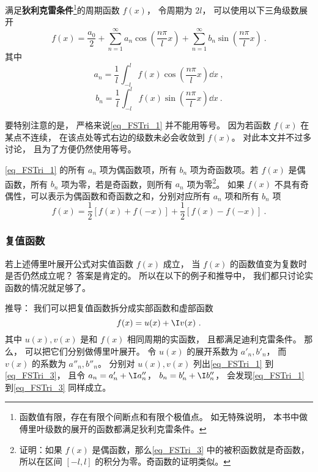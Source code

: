 


满足\textbf{狄利克雷条件}\footnote{函数值有限，存在有限个间断点和有限个极值点。 如无特殊说明， 本书中做傅里叶级数的展开的函数都满足狄利克雷条件。}的周期函数 $f(x)$， 令周期为 $2l$， 可以使用以下三角级数展开
\begin{equation}\label{eq_FSTri_1}
f( x ) = \frac{a_0}{2} + \sum_{n = 1}^\infty a_n \cos (\frac{n\pi}{l}x) + \sum_{n = 1}^\infty b_n \sin (\frac{n\pi}{l}x)~.
\end{equation}
其中
\begin{equation}\label{eq_FSTri_2}
a_n = \frac{1}{l} \int_{ - l}^l f( x )\cos(\frac{n\pi}{l}x) \dd{x} ~,
\end{equation}
\begin{equation}\label{eq_FSTri_3}
b_n = \frac{1}{l} \int_{ - l}^l f( x )\sin(\frac{n\pi}{l}x) \dd{x}~.
\end{equation}

要特别注意的是， 严格来说\autoref{eq_FSTri_1} 并不能用等号。 因为若函数 $f(x)$ 在某点不连续， 在该点处等式右边的级数未必会收敛到 $f(x)$。 对此本文并不过多讨论， 且为了方便仍然使用等号。

\autoref{eq_FSTri_1} 的所有 $a_n$ 项为偶函数项，所有 $b_n$ 项为奇函数项。若 $f(x)$ 是偶函数，所有 $b_n$ 项为零，若是奇函数，则所有 $a_n$ 项为零\footnote{证明：如果 $f(x)$ 是偶函数，那么\autoref{eq_FSTri_3} 中的被积函数就是奇函数， 所以在区间 $[-l,l]$ 的积分为零。奇函数的证明类似。}。 如果 $f(x)$ 不具有奇偶性，可以表示为偶函数和奇函数之和，分别对应所有 $a_n$ 项和所有 $b_n$ 项
\begin{equation}
f(x) = \frac12 [f(x)+f(-x)] + \frac12 [f(x)-f(-x)]~.
\end{equation}

\subsubsection{复值函数}
若上述傅里叶展开公式对实值函数 $f(x)$ 成立， 当 $f(x)$ 的函数值变为复数时是否仍然成立呢？ 答案是肯定的。 所以在以下的例子和推导中， 我们都只讨论实函数的情况就足够了。

推导： 我们可以把复值函数拆分成实部函数和虚部函数
\begin{equation}
f(x) = u(x) + \I v(x)~.
\end{equation}
其中 $u(x), v(x)$ 是和 $f(x)$ 相同周期的实函数， 且都满足迪利克雷条件。 那么， 可以把它们分别做傅里叶展开。 令 $u(x)$ 的展开系数为 $a'_n, b'_n$， 而 $v(x)$ 的系数为 $a''_n, b''_n$。 分别对 $u(x), v(x)$ 列出\autoref{eq_FSTri_1} 到\autoref{eq_FSTri_3}， 且令 $a_n = a'_n + \I a''_n$， $b_n = b'_n + \I b''_n$， 会发现\autoref{eq_FSTri_1} 到\autoref{eq_FSTri_3} 同样成立。


